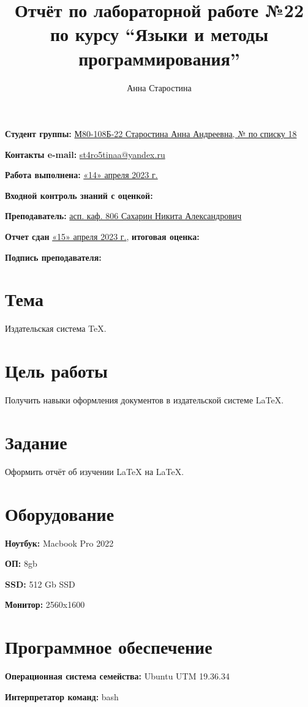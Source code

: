 \documentclass[12pt, letterpaper]{article}
\title{Отчёт по лабораторной работе №22 по курсу “Языки и методы программирования”}
\author{Анна Старостина}
\begin{document}
\maketitle
\begin{description}
\item\textbf{Студент группы:} \underline{М80-108Б-22 Старостина Анна Андреевна, № по списку 18}    
\item\textbf{Контакты e-mail:} \underline{st4ro5tinaa@yandex.ru}
\item\textbf{Работа выполнена:} \underline{«14» апреля 2023 г.}
\item\textbf{Входной контроль знаний с оценкой:} 
\item\textbf{Преподаватель:} \underline{асп. каф. 806 Сахарин Никита Александрович}
\item\textbf{Отчет сдан} \underline{«15» апреля 2023 г.}, \textbf{итоговая оценка:} 
\item\textbf{Подпись преподавателя:} \underline{\hspace{3cm}}
\end{description}
\section{Тема}
Издательская система \TeX{}.
\section{Цель работы}
Получить навыки оформления документов в издательской системе \LaTeX{}.
\section{Задание}
Оформить отчёт об изучении \LaTeX{} на \LaTeX{}.
\section{Оборудование}
\begin{description}
\item\textbf{Ноутбук:} Macbook Pro 2022
\item\textbf{ОП:} 8gb
\item\textbf{SSD:} 512 Gb SSD
\item\textbf{Монитор:} 2560x1600
\end{description}
\section{Программное обеспечение}
\begin{description}
\item\textbf{Операционная система семейства:} Ubuntu UTM 19.36.34
\item\textbf{Интерпретатор команд:} bash
\end{description}
\end{document}
